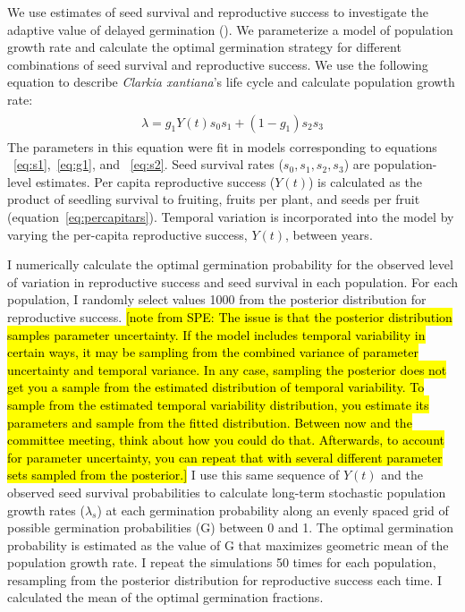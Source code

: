 \documentclass[12pt, oneside, titlepage]{article}   	%
\begin{document}
We use estimates of seed survival and reproductive success to investigate the adaptive value of delayed germination (\cite{gremer2014}). We parameterize a model of population growth rate and calculate the optimal germination strategy for different combinations of seed survival and reproductive success. We use the following equation to describe \textit{Clarkia xantiana}'s life cycle and calculate population growth rate:
%
\begin{align}
  \begin{split}
\lambda = g_1 Y(t) s_0 s_1  + (1-g_1) s_2 s_3
  \end{split}
\end{align}
%
The parameters in this equation were fit in models corresponding to equations ~\eqref{eq:s1},~\eqref{eq:g1}, and ~\eqref{eq:s2}. Seed survival rates ($s_0, s_1, s_2, s_3$) are population-level estimates. Per capita reproductive success ($Y(t)$) is calculated as the product of seedling survival to fruiting, fruits per plant, and seeds per fruit (equation~\eqref{eq:percapitars}). Temporal variation is incorporated into the model by varying the per-capita reproductive success, $Y(t)$, between years.

I numerically calculate the optimal germination probability for the observed level of variation in reproductive success and seed survival in each population. For each population, I randomly select values 1000 from the posterior distribution for reproductive success. \hl{[note from SPE: The issue is that the posterior distribution samples parameter uncertainty. If the model includes temporal variability in certain ways, it may be sampling from the combined variance of parameter uncertainty and temporal variance. In any case, sampling the posterior does not get you a sample from the estimated distribution of temporal variability. To sample from the estimated temporal variability distribution, you estimate its parameters and sample from the fitted distribution. Between now and the committee meeting, think about how you could do that. Afterwards, to account for parameter uncertainty, you can repeat that with several different parameter sets sampled from the posterior.]} I use this same sequence of $Y(t)$ and the observed seed survival probabilities to calculate long-term stochastic population growth rates ($\lambda_s$) at each germination probability along an evenly spaced grid of possible germination probabilities (G) between 0 and 1. The optimal germination probability is estimated as the value of G that maximizes geometric mean of the population growth rate. I repeat the simulations 50 times for each population, resampling from the posterior distribution for reproductive success each time. I calculated the mean of the optimal germination fractions.  
\end{document}
